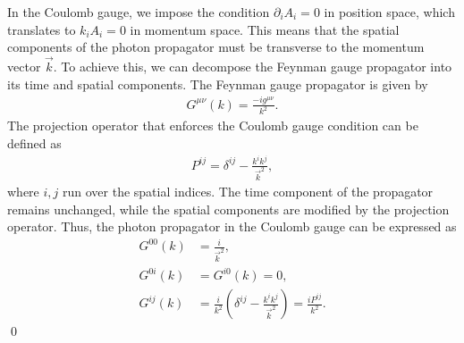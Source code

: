 \answer{}
In the Coulomb gauge, we impose the condition $\partial_i A_i = 0$ in position space, which translates to $k_i A_i = 0$ in momentum space. This means that the spatial components of the photon propagator must be transverse to the momentum vector $\vec{k}$. To achieve this, we can decompose the Feynman gauge propagator into its time and spatial components. The Feynman gauge propagator is given by
\begin{align}
    G^{\mu\nu}(k) = \frac{-ig^{\mu\nu}}{k^2}.
\end{align}
The projection operator that enforces the Coulomb gauge condition can be defined as
\begin{align}
    P^{ij} = \delta^{ij} - \frac{k^i k^j}{\vec{k}^2},
\end{align} where $i,j$ run over the spatial indices. The time component of the propagator remains unchanged, while the spatial components are modified by the projection operator. Thus, the photon propagator in the Coulomb gauge can be expressed as
\begin{align}
G^{00}(k) &= \frac{i}{\vec{k}^2}, \\
G^{0i}(k) &= G^{i0}(k) = 0, \\
G^{ij}(k) &= \frac{i}{k^2} \left( \delta^{ij} - \frac{k^i k^j}{\vec{k}^2} \right) = \frac{i P^{ij}}{k^2}.
\end{align}
\qed